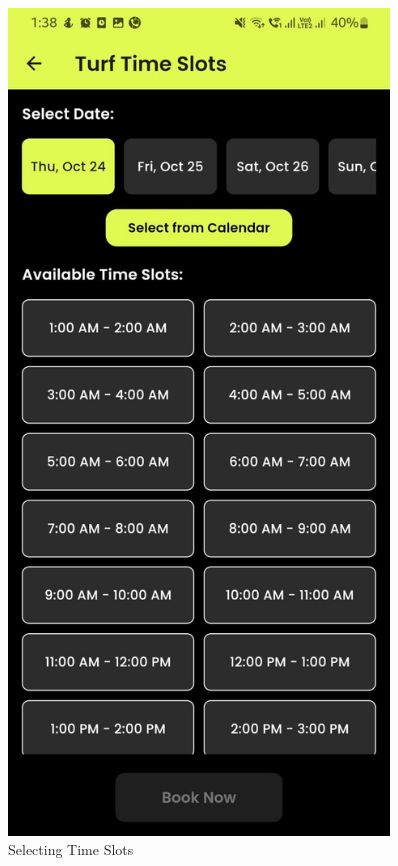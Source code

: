 \documentclass[12pt,a4paper]{report}
\begin{document}
\begin{figure}[H]
    \vspace{1cm}
    
    \begin{minipage}[t]{0.3\textwidth}
        \centering
        \includegraphics[width=0.9\textwidth]{assets/screenshot4.jpeg}
        \caption{Selecting Time Slots}

\end{minipage}
\end{figure}
\end{document}
